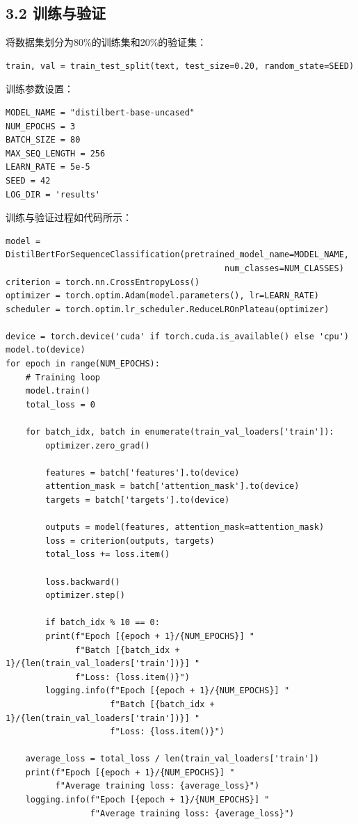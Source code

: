 \documentclass{article}
\begin{document}
\subsection*{3.2 训练与验证}
将数据集划分为80\%的训练集和20\%的验证集：
\begin{lstlisting}[style=Style]
train, val = train_test_split(text, test_size=0.20, random_state=SEED)
\end{lstlisting}
\hspace{2em}训练参数设置：
\begin{lstlisting}[style=Style]
MODEL_NAME = "distilbert-base-uncased"
NUM_EPOCHS = 3
BATCH_SIZE = 80
MAX_SEQ_LENGTH = 256
LEARN_RATE = 5e-5
SEED = 42
LOG_DIR = 'results'
\end{lstlisting}
\hspace{2em}训练与验证过程如代码所示：
\begin{lstlisting}[style=Style]
model = DistilBertForSequenceClassification(pretrained_model_name=MODEL_NAME,
                                            num_classes=NUM_CLASSES)
criterion = torch.nn.CrossEntropyLoss()
optimizer = torch.optim.Adam(model.parameters(), lr=LEARN_RATE)
scheduler = torch.optim.lr_scheduler.ReduceLROnPlateau(optimizer)

device = torch.device('cuda' if torch.cuda.is_available() else 'cpu')
model.to(device)
for epoch in range(NUM_EPOCHS):
    # Training loop
    model.train()
    total_loss = 0

    for batch_idx, batch in enumerate(train_val_loaders['train']):
        optimizer.zero_grad()

        features = batch['features'].to(device)
        attention_mask = batch['attention_mask'].to(device)
        targets = batch['targets'].to(device)

        outputs = model(features, attention_mask=attention_mask)
        loss = criterion(outputs, targets)
        total_loss += loss.item()

        loss.backward()
        optimizer.step()

        if batch_idx % 10 == 0:
        print(f"Epoch [{epoch + 1}/{NUM_EPOCHS}] "
              f"Batch [{batch_idx + 1}/{len(train_val_loaders['train'])}] "
              f"Loss: {loss.item()}")
        logging.info(f"Epoch [{epoch + 1}/{NUM_EPOCHS}] "
                     f"Batch [{batch_idx + 1}/{len(train_val_loaders['train'])}] "
                     f"Loss: {loss.item()}")

    average_loss = total_loss / len(train_val_loaders['train'])
    print(f"Epoch [{epoch + 1}/{NUM_EPOCHS}] "
          f"Average training loss: {average_loss}")
    logging.info(f"Epoch [{epoch + 1}/{NUM_EPOCHS}] "
                 f"Average training loss: {average_loss}")


\end{lstlisting}
\end{document}
